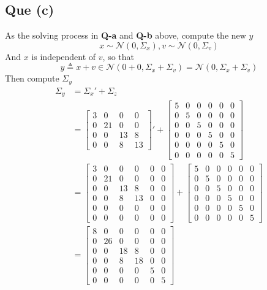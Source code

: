 \documentclass[12pt, letterpaper]{article}
\begin{document}
\subsection*{Que (c)}
As the solving process in \textbf{Q-a} and \textbf{Q-b} above, compute the new $y$
\begin{equation}
	x\sim\mathcal{N}(0,\Sigma_x),v\sim\mathcal{N}(0,\Sigma_v)
\end{equation}
And $x$ is independent of $v$, so that
\begin{equation}
	y\triangleq x+v\in\mathcal{N}(0+0,\Sigma_x+\Sigma_v)=\mathcal{N}(0,\Sigma_x+\Sigma_v)
\end{equation}
Then compute $\Sigma_y$
\begin{equation}
\begin{align}
	\Sigma_y
	&= \Sigma_x'+\Sigma_z\\
	&= \left[\begin{array}{cccc}
		3 & 0 & 0 & 0\\
		0 & 21 & 0 & 0\\
		0 & 0 & 13 & 8\\
		0 & 0 & 8 & 13
	\end{array}\right]'+\left[\begin{array}{cccccc}
		5 & 0 & 0 & 0 & 0 & 0\\
		0 & 5 & 0 & 0 & 0 & 0\\
		0 & 0 & 5 & 0 & 0 & 0\\
		0 & 0 & 0 & 5 & 0 & 0\\
		0 & 0 & 0 & 0 & 5 & 0\\
		0 & 0 & 0 & 0 & 0 & 5
	\end{array}\right]\\
	&= \left[\begin{array}{cccccc}
		3 & 0 & 0 & 0 & 0 & 0\\
		0 & 21 & 0 & 0 & 0 & 0\\
		0 & 0 & 13 & 8 & 0 & 0\\
		0 & 0 & 8 & 13 & 0 & 0\\
		0 & 0 & 0 & 0 & 0 & 0\\
		0 & 0 & 0 & 0 & 0 & 0
	\end{array}\right]+\left[\begin{array}{cccccc}
		5 & 0 & 0 & 0 & 0 & 0\\
		0 & 5 & 0 & 0 & 0 & 0\\
		0 & 0 & 5 & 0 & 0 & 0\\
		0 & 0 & 0 & 5 & 0 & 0\\
		0 & 0 & 0 & 0 & 5 & 0\\
		0 & 0 & 0 & 0 & 0 & 5
	\end{array}\right]\\
	&= \left[\begin{array}{cccccc}
		8 & 0 & 0 & 0 & 0 & 0\\
		0 & 26 & 0 & 0 & 0 & 0\\
		0 & 0 & 18 & 8 & 0 & 0\\
		0 & 0 & 8 & 18 & 0 & 0\\
		0 & 0 & 0 & 0 & 5 & 0\\
		0 & 0 & 0 & 0 & 0 & 5
	\end{array}\right]
\end{align}
\end{equation}
\end{document}
